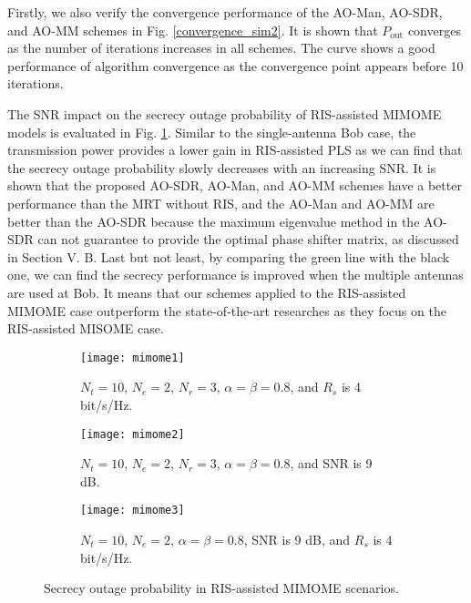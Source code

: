 \documentclass[journal]{IEEEtran}
\theoremstyle{definition}
\begin{document}
Firstly, we also verify the convergence performance of the AO-Man, AO-SDR, and AO-MM schemes in Fig. \ref{convergence_sim2}. It is shown that $P_\text{out}$ converges as the number of iterations increases in all schemes. The curve shows a good performance of algorithm convergence as the convergence point appears before 10 iterations. 

The SNR impact on the secrecy outage probability of RIS-assisted MIMOME models is evaluated in Fig. \ref{mimome1}. Similar to the single-antenna Bob case, the transmission power provides a lower gain in RIS-assisted PLS as we can find that the secrecy outage probability slowly decreases with an increasing SNR. It is shown that the proposed AO-SDR, AO-Man, and AO-MM schemes have a better performance than the MRT without RIS, and the AO-Man and AO-MM are better than the AO-SDR because the maximum eigenvalue method in the AO-SDR can not guarantee to provide the optimal phase shifter matrix, as discussed in Section V. B. Last but not least, by comparing the green line with the black one, we can find the secrecy performance is improved when the multiple antennas are used at Bob. It means that our schemes applied to the RIS-assisted MIMOME case outperform the state-of-the-art researches \cite{Wuirs2019,Hong2019,Dong2020} as they focus on the RIS-assisted MISOME case.

\begin{figure*}[h!]
\begin{subfigure}[t]{.32\textwidth}
\centering
\texttt{[image: mimome1]}
\caption{$N_t=10$, $N_e=2$, $N_r=3$, $\alpha=\beta=0.8$, and $R_s$ is 4 bit/s/Hz.}\label{mimome1}
\end{subfigure}\hfill
\begin{subfigure}[t]{.32\textwidth}
\centering
\texttt{[image: mimome2]}
\caption{$N_t=10$, $N_e=2$, $N_r=3$, $\alpha=\beta=0.8$, and SNR is 9 dB.}\label{mimome2}
\end{subfigure}
\begin{subfigure}[t]{.32\textwidth}
\centering
\texttt{[image: mimome3]}
\caption{$N_t=10$, $N_e=2$, $\alpha=\beta=0.8$, SNR is 9 dB, and $R_s$ is 4 bit/s/Hz.}\label{mimome3}
\end{subfigure}
\caption{Secrecy outage probability in RIS-assisted MIMOME scenarios.}
\end{figure*}
\end{document}
